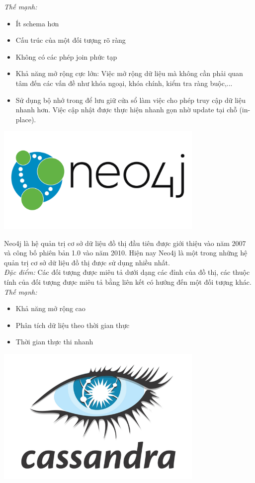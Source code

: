 \textit{Thế mạnh:}
\begin{itemize}
    \item Ít schema hơn
    \item Cấu trúc của một đối tượng rõ ràng
    \item Không có các phép join phức tạp
    \item Khả năng mở rộng cực lớn: Việc mở rộng dữ liệu mà không cần phải quan tâm đến các vấn đề như khóa ngoại, khóa chính, kiểm tra ràng buộc,...
    \item Sử dụng bộ nhớ trong để lưu giữ cửa sổ làm việc cho phép truy cập dữ liệu nhanh hơn. Việc cập nhật được thực hiện nhanh gọn nhờ update tại chỗ (in-place).
\end{itemize}
\begin{center}
  \captionsetup{type=figure}
  \includegraphics[width=10cm]{img/neo4j.png}
\end{center}

Neo4j là hệ quản trị cơ sở dữ liệu đồ thị đầu tiên được giới thiệu vào năm 2007 và công bố phiên bản 1.0 vào năm 2010. Hiện nay Neo4j là một trong những hệ quản trị cơ sở dữ liệu đồ thị được sử dụng nhiều nhất.\\

\textit{Đặc điểm:} Các đối tượng được miêu tả dưới dạng các đỉnh của đồ thị, các thuộc tính của đối tượng được miêu tả bằng liên kết có hướng đến một đối tượng khác.\\

\textit{Thế mạnh:}
\begin{itemize}
    \item Khả năng mở rộng cao
    \item Phân tích dữ liệu theo thời gian thực
    \item Thời gian thực thi nhanh
\end{itemize}
\begin{center}
  \captionsetup{type=figure}
  \includegraphics[width=10cm]{img/cassandra.png}
\end{center}


